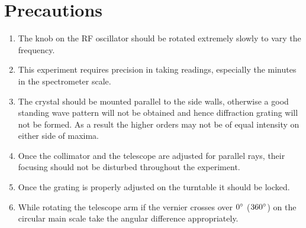\documentclass{article}
\begin{document}
\section{Precautions}
\begin{enumerate}
    \item The knob on the RF oscillator should be rotated extremely slowly to vary the frequency. 
    \item This experiment requires precision in taking readings, especially the minutes in the spectrometer scale. 
    \item The crystal should be mounted parallel to the side walls, otherwise a good standing wave pattern will not be obtained and hence diffraction grating will not be formed. As a result the higher orders may not be of equal intensity on either side of maxima.
    \item Once the collimator and the telescope are adjusted for parallel rays, their focusing should not be disturbed throughout the experiment.
    \item Once the grating is properly adjusted on the turntable it should be locked.
    \item While rotating the telescope arm if the vernier crosses over $0 \degree$ ($360 \degree$) on the circular main scale take the angular difference appropriately.
\end{enumerate}
\end{document}
